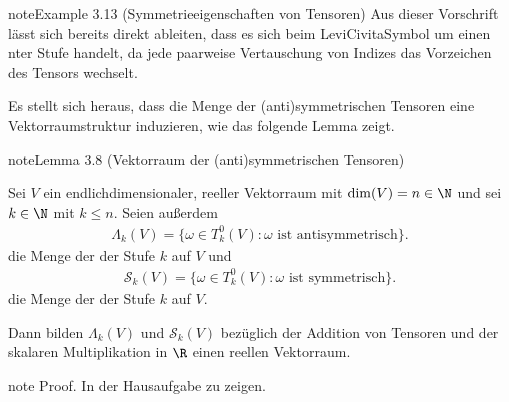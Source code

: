 \documentclass[letterpaper,10pt,english]{jupyterBook}
\begin{document}
\begin{sphinxadmonition}{note}{Example 3.13 (Symmetrieeigenschaften von Tensoren)}
\sphinxAtStartPar
Aus dieser Vorschrift lässt sich bereits direkt ableiten, dass es sich beim Levi\sphinxhyphen{}Civita\sphinxhyphen{}Symbol um einen  n\sphinxhyphen{}ter Stufe handelt, da jede paarweise Vertauschung von Indizes das Vorzeichen des Tensors wechselt.
\end{sphinxadmonition}

\sphinxAtStartPar
Es stellt sich heraus, dass die Menge der (anti\sphinxhyphen{})symmetrischen Tensoren eine Vektorraumstruktur induzieren, wie das folgende Lemma zeigt.
\label{vektoranalysis/tensor:lemma-30}
\begin{sphinxadmonition}{note}{Lemma 3.8 (Vektorraum der (anti\sphinxhyphen{})symmetrischen Tensoren)}



\sphinxAtStartPar
Sei \(V\) ein endlich\sphinxhyphen{}dimensionaler, reeller Vektorraum mit \(\operatorname{dim}(V) = n \in \N\) und sei \(k \in \N\) mit \(k \leq n\).
Seien außerdem
\begin{equation*}
\begin{split}\Lambda_k(V) = \lbrace \omega \in T_k^0(V) : \omega \text{ ist antisymmetrisch} \rbrace.\end{split}
\end{equation*}
\sphinxAtStartPar
die Menge der  der Stufe \(k\) auf \(V\) und
\begin{equation*}
\begin{split}\mathcal{S}_k(V) = \lbrace \omega \in T_k^0(V) : \omega \text{ ist symmetrisch} \rbrace.\end{split}
\end{equation*}
\sphinxAtStartPar
die Menge der  der Stufe \(k\) auf \(V\).

\sphinxAtStartPar
Dann bilden \(\Lambda_k(V)\) und \(\mathcal{S}_k(V)\) bezüglich der Addition von Tensoren und der skalaren Multiplikation in \(\R\) einen reellen Vektorraum.
\end{sphinxadmonition}

\begin{sphinxadmonition}{note}
\sphinxAtStartPar
Proof. In der Hausaufgabe zu zeigen.
\end{sphinxadmonition}
\end{document}
